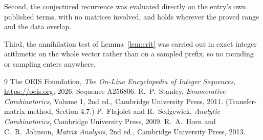 \documentclass[11pt,a4paper]{article}
\theoremstyle{plain}
\theoremstyle{definition}
\begin{document}
Second, the conjectured recurrence was evaluated directly on the entry's own published terms,
with no matrices involved, and holds wherever the proved range and the data overlap.

Third, the annihilation test of Lemma~\ref{lem:crit} was carried out in exact integer
arithmetic on the whole vector rather than on a sampled prefix, so no rounding or sampling
enters anywhere.

\begin{thebibliography}{9}
 The OEIS Foundation, \emph{The On-Line Encyclopedia of Integer
Sequences}, \url{https://oeis.org}, 2026. Sequence A256806.
 R.~P.~Stanley, \emph{Enumerative Combinatorics}, Volume 1, 2nd ed.,
Cambridge University Press, 2011. (Transfer-matrix method, Section 4.7.)
 P.~Flajolet and R.~Sedgewick, \emph{Analytic Combinatorics}, Cambridge
University Press, 2009.
 R.~A.~Horn and C.~R.~Johnson, \emph{Matrix Analysis}, 2nd ed., Cambridge
University Press, 2013.
\end{thebibliography}
\end{document}
